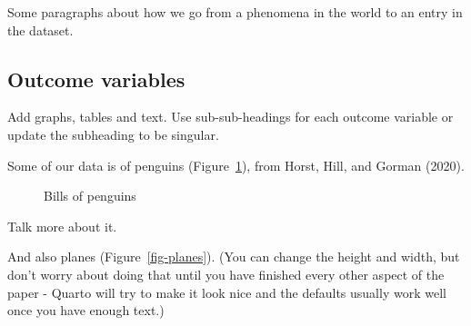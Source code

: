 \documentclass[
  letterpaper,
  DIV=11,
  numbers=noendperiod]{scrartcl}
\begin{document}
Some paragraphs about how we go from a phenomena in the world to an
entry in the dataset.

\subsection{Outcome variables}\label{outcome-variables}

Add graphs, tables and text. Use sub-sub-headings for each outcome
variable or update the subheading to be singular.

Some of our data is of penguins (Figure~\ref{fig-bills}), from Horst,
Hill, and Gorman (2020).

\begin{figure}


\caption{\label{fig-bills}Bills of penguins}

\end{figure}%

Talk more about it.

And also planes (Figure~\ref{fig-planes}). (You can change the height
and width, but don't worry about doing that until you have finished
every other aspect of the paper - Quarto will try to make it look nice
and the defaults usually work well once you have enough text.)
\end{document}
